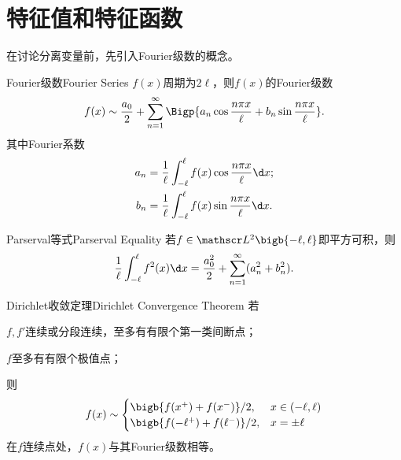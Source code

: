 \section{特征值和特征函数}
在讨论分离变量前，先引入Fourier级数的概念。
\begin{definition}{Fourier级数}{Fourier Series}
	$f(x)$周期为$2\ell$，则$f(x)$的Fourier级数
	\begin{align}
		f(x)\sim\frac{a_0}2+\sum_{n=1}^\infty\Bigp{a_n\cos\frac{n\pi x}\ell+b_n\sin\frac{n\pi x}\ell}.
	\end{align}
	其中Fourier系数
	\begin{align*}
		a_n & =\frac1\ell\int_{-\ell}^\ell f(x)\cos\frac{n\pi x}\ell\d x; \\
		b_n & =\frac1\ell\int_{-\ell}^\ell f(x)\sin\frac{n\pi x}\ell\d x.
	\end{align*}
\end{definition}
\begin{theorem}{Parserval等式}{Parserval Equality}
	若$f\in\mathscr L^2\bigb{-\ell,\ell}$即平方可积，则
	\[
		\frac1\ell\int_{-\ell}^\ell f^2(x)\d x=\frac{a_0^2}2+\sum_{n=1}^\infty(a_n^2+b_n^2).
	\]
\end{theorem}
\begin{theorem}{Dirichlet收敛定理}{Dirichlet Convergence Theorem}
	若
	\begin{compactenum}
		\item $f,f'$连续或分段连续，至多有有限个第一类间断点；%
		\item $f$至多有有限个极值点；
	\end{compactenum}
	则
	\begin{align*}
		f(x)
		\sim\begin{cases}
			\bigb{f(x^+)+f(x^-)}/2,        & x\in(-\ell,\ell) \\
			\bigb{f(-\ell^+)+f(\ell^-)}/2, & x=\pm\ell
		\end{cases}
	\end{align*}
	在$f$连续点处，$f(x)$与其Fourier级数相等。
\end{theorem}
